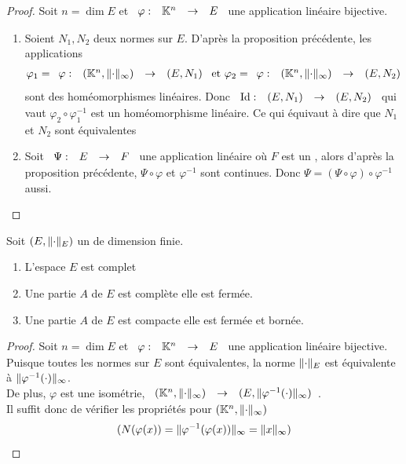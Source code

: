 \documentclass[]{report}
\begin{document}
    \begin{proof}
        Soit $n=\dim E$ et $\begin{array}{ccccc} \varphi : & \mathbb{K}^n & \to & E \end{array}$ une application linéaire bijective.
        \begin{enumerate}
            \item Soient $N_1,N_2$ deux normes sur $E$. D'après la proposition précédente, les applications
            \[\varphi_1=\begin{array}{ccccc} \varphi : & (\mathbb{K}^n,\lVert \cdot \rVert_\infty) & \to & (E,N_1) \end{array}\text{ et }\varphi_2=\begin{array}{ccccc} \varphi : & (\mathbb{K}^n,\lVert \cdot \rVert_\infty) & \to & (E,N_2) \end{array}\]
            sont des homéomorphismes linéaires. Donc $\begin{array}{ccccc} \text{Id} : & (E,N_1) & \to & (E,N_2) \end{array}$ qui vaut $\varphi_2\circ \varphi_1^{-1}$ est un homéomorphisme linéaire. Ce qui équivaut à dire que $N_1$ et $N_2$ sont équivalentes
            \item Soit $\begin{array}{ccccc} \Psi : & E & \to & F \end{array}$ une application linéaire où $F$ est un \evn, alors d'après la proposition précédente, $\Psi\circ\varphi$ et $\varphi^{-1}$ sont continues. Donc $\Psi=(\Psi\circ\varphi)\circ\varphi^{-1}$ aussi.
        \end{enumerate}
    \end{proof}

    \begin{prop}{}{}
        Soit $(E,\lVert \cdot \rVert_E)$ un \evn de dimension finie.
        \begin{enumerate}
            \item L'espace $E$ est complet
            \item Une partie $A$ de $E$ est complète \ssi elle est fermée.
            \item Une partie $A$ de $E$ est compacte \ssi elle est fermée et bornée.
        \end{enumerate}
    \end{prop}

    \begin{proof}
        Soit $n=\dim E$ et $\begin{array}{ccccc} \varphi : & \mathbb{K}^n & \to & E \end{array}$ une application linéaire bijective. Puisque toutes les normes sur $E$ sont équivalentes, la norme $\lVert \cdot \rVert_E$ est équivalente à $\lVert \varphi^{-1}(\cdot) \rVert_\infty$.\\
        De plus, $\varphi$ est une isométrie, $\begin{array}{ccccc} (\mathbb{K}^n,\lVert \cdot \rVert_\infty) & \to & (E,\lVert \varphi^{-1}(\cdot) \rVert_\infty) \end{array}$.\\
        Il suffit donc de vérifier les propriétés pour $(\mathbb{K}^n,\lVert \cdot \rVert_\infty)$
        \[(N(\varphi(x))=\lVert \varphi^{-1}(\varphi(x)) \rVert_\infty=\lVert x \rVert_\infty)\]
    \end{proof}
\end{document}
